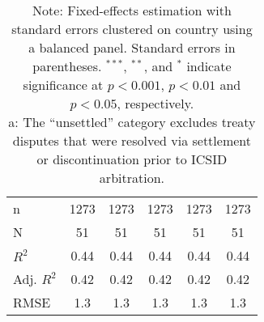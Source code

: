 \documentclass[12pt,onesided]{amsart}
\begin{document}
\begin{table}[ht]
\begin{tabular}{lccccc}
   \hline
n & 1273 & 1273 & 1273 & 1273 & 1273 \\ 
  N & 51 & 51 & 51 & 51 & 51 \\ 
  $R^{2}$ & 0.44 & 0.44 & 0.44 & 0.44 & 0.44 \\ 
  Adj. $R^{2}$ & 0.42 & 0.42 & 0.42 & 0.42 & 0.42 \\ 
  RMSE & 1.3 & 1.3 & 1.3 & 1.3 & 1.3 \\ 
   \hline\hline
\end{tabular}
\caption*{Note: Fixed-effects estimation with standard errors clustered on country using a balanced panel. Standard errors in parentheses. $^{***}$, $^{**}$, and $^{*}$ indicate significance at $p<0.001$, $p<0.01$ and $p<0.05$, respectively. \\ a: The ``unsettled'' category excludes treaty disputes that were resolved via settlement or discontinuation prior to ICSID arbitration.}
\end{table}

\newpage


\clearpage
\end{document}
